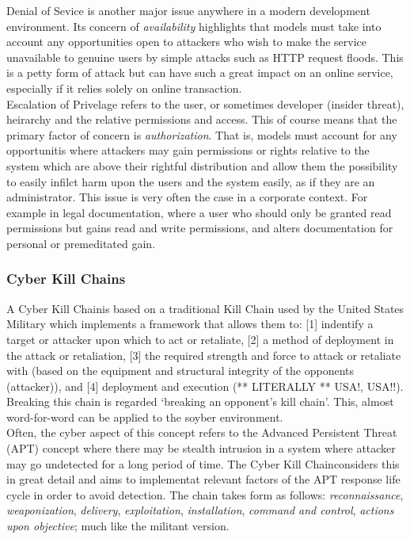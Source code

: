 \documentclass[11pt, english]{article}
\begin{document}
	Denial of Sevice is another major issue anywhere in a modern development environment. Its concern of \textit{availability} highlights that models must take into account any opportunities open to attackers who wish to make the service unavailable to genuine users by simple attacks such as HTTP request floods. This is a petty form of attack but can have such a great impact on an online service, especially if it relies solely on online transaction.\\

	Escalation of Privelage refers to the user, or sometimes developer (insider threat), heirarchy and the relative permissions and access. This of course means that the primary factor of concern is \textit{authorization}. That is, models must account for any opportunitis where attackers may gain permissions or rights relative to the system which are above their rightful distribution and allow them the possibility to easily infilct harm upon the users and the system easily, as if they are an administrator. This issue is very often the case in a corporate context. For example in legal documentation, where a user who should only be granted read permissions but gains read and write permissions, and alters documentation for personal or premeditated gain.

		\subsubsection{Cyber Kill Chains\textregistered}

	A Cyber Kill Chain\textregistered is based on a traditional Kill Chain used by the United States Military which implements a framework that allows them to: [1] indentify a target or attacker upon which to act or retaliate, [2] a method of deployment in the attack or retaliation, [3] the required strength and force to attack or retaliate with (based on the equipment and structural integrity of the opponents (attacker)), and [4] deployment and execution (** LITERALLY ** USA!, USA!!). Breaking this chain is regarded `breaking an opponent's kill chain'. This, almost word-for-word can be applied to the soyber environment.\\

	Often, the cyber aspect of this concept refers to the Advanced Persistent Threat (APT) concept where there may be stealth intrusion in a system where attacker may go undetected for a long period of time. The Cyber Kill Chain\textregistered considers this in great detail and aims to implementat relevant factors of the APT response life cycle in order to avoid detection. The chain takes form as follows: \textit{reconnaissance}, \textit{weaponization}, \textit{delivery}, \textit{exploitation}, \textit{installation}, \textit{command and control}, \textit{actions upon objective}; much like the militant version.\\
\end{document}
